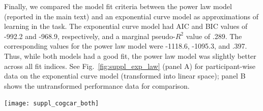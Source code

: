 \documentclass[a4paper,doc,floatsintext,natbib,10pt]{apa6}
\begin{document}
Finally, we compared the model fit criteria between the power law model (reported in the main text) and an exponential curve model as approximations of learning in the task. The exponential curve model had AIC and BIC values of -992.2 and -968.9, respectively, and a marginal pseudo-$R^2$ value of .289. The corresponding values for the power law model were -1118.6, -1095.3, and .397. Thus, while both models had a good fit, the power law model was slightly better across all fit indices. See Fig.~\ref{fig:suppl_exp_law} (panel A) for participant-wise data on the exponential curve model (transformed into linear space); panel B shows the untransformed performance data for comparison.

\noindent
\begin{minipage}{\textwidth}
\centering
\texttt{[image: suppl\_cogcar\_both]}
\label{fig:suppl_exp_law}
\end{minipage}



\end{document}
